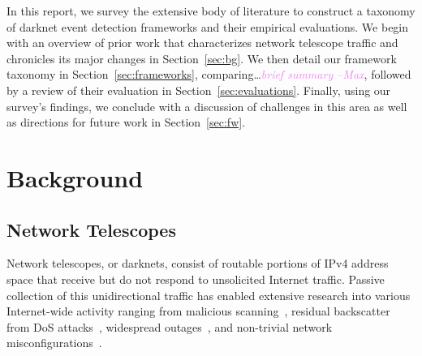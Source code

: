 \documentclass[manuscript,nonacm]{acmart}
\newcommand{\maxnote}[1]{\textit{\textcolor{violet}{#1 --Max}}}
\begin{document}


In this report, we survey the extensive body of literature to construct a taxonomy of darknet event detection frameworks and their empirical evaluations.
We begin with an overview of prior work that characterizes network telescope traffic and chronicles its major changes in Section~\ref{sec:bg}.
We then detail our framework taxonomy in Section~\ref{sec:frameworks}, comparing\dots\maxnote{brief summary}, followed by a review of their evaluation in Section~\ref{sec:evaluations}.
Finally, using our survey's findings, we conclude with a discussion of challenges in this area as well as directions for future work in Section~\ref{sec:fw}.


\label{sec:bg}
\section{Background}

\subsection{Network Telescopes}

Network telescopes, or darknets, consist of routable portions of IPv4 address space that receive but do not respond to unsolicited Internet traffic. 
Passive collection of this unidirectional traffic has enabled extensive research into various Internet-wide activity ranging from 
malicious scanning~\cite{@@}, residual backscatter from DoS attacks~\cite{@@}, widespread outages~\cite{@@}, and non-trivial network misconfigurations~\cite{@@}.
\end{document}
